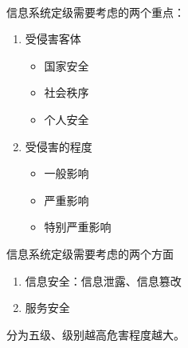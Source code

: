  
 
\\
信息系统定级需要考虑的两个重点：
\begin{enumerate}
	\item 受侵害客体
	\begin{itemize}
		\item 国家安全
		\item 社会秩序
		\item 个人安全
	\end{itemize}
	\item  受侵害的程度
	\begin{itemize}
		\item 一般影响
		\item 严重影响
		\item 特别严重影响
	\end{itemize}
\end{enumerate}
信息系统定级需要考虑的两个方面
\begin{enumerate}
	\item 信息安全：信息泄露、信息篡改
	\item 服务安全
\end{enumerate}

分为五级、级别越高危害程度越大。























